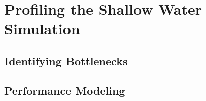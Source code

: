
\section{Profiling the Shallow Water Simulation}
\label{sec-profile}

\subsection{Identifying Bottlenecks}
\label{sec-profile-bottlenecks}

\subsection{Performance Modeling}
\label{sec-profile-modeling}
